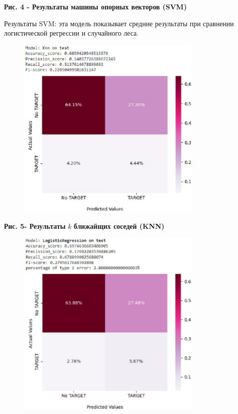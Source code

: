 {\bfseries Рис. 4 - Результаты машины опорных векторов (SVM)}

Результаты SVM: эта модель показывает средние результаты при сравнении
логистической регрессии и случайного леса.

\begin{figure}[H]
	\centering
	\includegraphics[width=0.8\textwidth]{assets/123}
	\caption*{}
\end{figure}

{\bfseries Рис. 5- Результаты}
$k$ {\bfseries ближайщих соседей (KNN)}

\begin{figure}[H]
	\centering
	\includegraphics[width=0.8\textwidth]{assets/124}
	\caption*{}
\end{figure}

